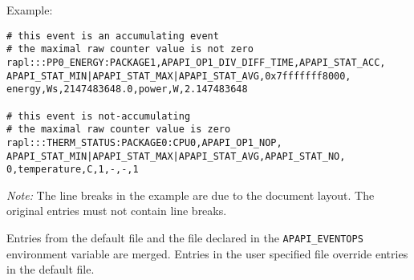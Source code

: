 Example:

\begin{verbatim}
# this event is an accumulating event
# the maximal raw counter value is not zero
rapl:::PP0_ENERGY:PACKAGE1,APAPI_OP1_DIV_DIFF_TIME,APAPI_STAT_ACC,
APAPI_STAT_MIN|APAPI_STAT_MAX|APAPI_STAT_AVG,0x7fffffff8000,
energy,Ws,2147483648.0,power,W,2.147483648

# this event is not-accumulating
# the maximal raw counter value is zero
rapl:::THERM_STATUS:PACKAGE0:CPU0,APAPI_OP1_NOP,
APAPI_STAT_MIN|APAPI_STAT_MAX|APAPI_STAT_AVG,APAPI_STAT_NO,
0,temperature,C,1,-,-,1
\end{verbatim}

\emph{Note:} The line breaks in the example are due to the document layout. The original entries must not contain line breaks.

Entries from the default file and the file declared in the \verb+APAPI_EVENTOPS+ environment variable are merged.
Entries in the user specified file override entries in the default file.
